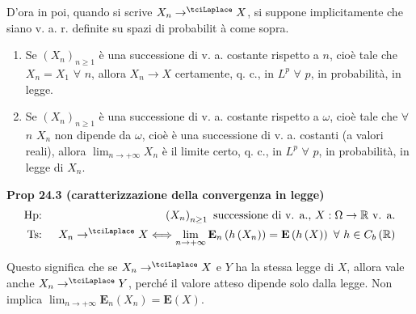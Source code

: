 \documentclass{article}
\begin{document}
D'ora in poi, quando si scrive $X_{n}\rightarrow ^{\tciLaplace }X$, si
suppone implicitamente che siano v. a. r. definite su spazi di probabilit%
\`{a} come sopra.

\begin{enumerate}
\item Se $\left( X_{n}\right) _{n\geq 1}$ \`{e} una successione di v. a.
costante rispetto a $n$, cio\`{e} tale che $X_{n}=X_{1}$ $\forall $ $n$,
allora $X_{n}\rightarrow X$ certamente, q. c., in $L^{p}$ $\forall $ $p$, in
probabilit\`{a}, in legge.

\item Se $\left( X_{n}\right) _{n\geq 1}$ \`{e} una successione di v. a.
costante rispetto a $\omega $, cio\`{e} tale che $\forall $ $n$ $X_{n}$ non
dipende da $\omega $, cio\`{e} \`{e} una successione di v. a. costanti (a
valori reali), allora $\lim_{n\rightarrow +\infty }X_{n}$ \`{e} il limite
certo, q. c., in $L^{p}$ $\forall $ $p$, in probabilit\`{a}, in legge di $%
X_{n}$.
\end{enumerate}

\textbf{Prop 24.3 (caratterizzazione della convergenza in legge)}%
\begin{eqnarray*}
\text{Hp}\text{: } &&\left( X_{n}\right) _{n\geq 1}\text{ successione di v.
a., }X:\Omega \rightarrow 
\mathbb{R}
\text{ v. a.} \\
\text{Ts}\text{: } &&X_{n}\rightarrow ^{\tciLaplace }X\Longleftrightarrow
\lim_{n\rightarrow +\infty }\mathbf{E}_{n}\left( h\left( X_{n}\right)
\right) =\mathbf{E}\left( h\left( X\right) \right) \text{ }\forall \text{ }%
h\in C_{b}\left( 
\mathbb{R}
\right)
\end{eqnarray*}

Questo significa che se $X_{n}\rightarrow ^{\tciLaplace }X$ e $Y$ ha la
stessa legge di $X$, allora vale anche $X_{n}\rightarrow ^{\tciLaplace }Y$,
perch\'{e} il valore atteso dipende solo dalla legge. Non implica $%
\lim_{n\rightarrow +\infty }\mathbf{E}_{n}\left( X_{n}\right) =\mathbf{E}%
\left( X\right) $.
\end{document}
